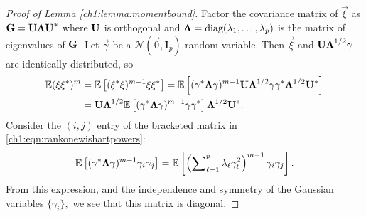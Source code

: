 \begin{proof}[Proof of Lemma \ref{ch1:lemma:momentbound}]

Factor the covariance matrix of $\vec{\xi}$ as $\mathbf{G} = \mathbf{U\Lambda
U}^*$ where $\mathbf{U}$ is orthogonal and $\mathbf{\Lambda} =
\text{diag}(\lambda_1, \ldots, \lambda_p)$ is the matrix of eigenvalues of
$\mathbf{G}$. Let $\vec{\gamma}$ be a $\mathcal{N}(\vec{0},\mathbf{I}_p)$ random
variable. Then $\vec{\xi}$ and $\mathbf{U\Lambda}^{1/2} \mathbf{\gamma}$ are
identically distributed, so 
\begin{align} 
\mathbb{E} (\mathbf{\xi}\mathbf{\xi}^*)^m & = \mathbb{E}\left[(\mathbf{\xi}^*\mathbf{\xi})^{m-1}
\mathbf{\xi}\mathbf{\xi}^* \right] = \mathbb{E}\left[ (\mathbf{\gamma}^* \mathbf{\Lambda}
\mathbf{\gamma})^{m-1} \mathbf{U\Lambda}^{1/2} \mathbf{\gamma}\mathbf{\gamma}^*
\mathbf{\Lambda}^{1/2} \mathbf{U}^* \right]\notag \\
 & = \mathbf{U\Lambda}^{1/2} \mathbb{E} \left[ (\mathbf{\gamma}^* \mathbf{\Lambda}
\mathbf{\gamma})^{m-1} \mathbf{\gamma}\mathbf{\gamma}^* \right]
\mathbf{\Lambda}^{1/2}\mathbf{U}^*. 
\label{ch1:eqn:rankonewishartpowers}
\end{align}
Consider the $(i,j)$ entry of the bracketed matrix in
\eqref{ch1:eqn:rankonewishartpowers}:
\begin{equation}
\mathbb{E}\left[(\mathbf{\gamma}^* \mathbf{\Lambda} \mathbf{\gamma})^{m-1} \gamma_i\gamma_j
\right] = \mathbb{E}\left[\left(\sum\nolimits_{\ell=1}^p \lambda_\ell \gamma_\ell^2
\right)^{m-1} \gamma_i \gamma_j\right]. 
\label{ch1:eqn:gaussianchaos}
\end{equation}
From this expression, and the independence and symmetry of the Gaussian variables $\{
\gamma_i \},$ we see that this matrix is diagonal.


\end{proof}
